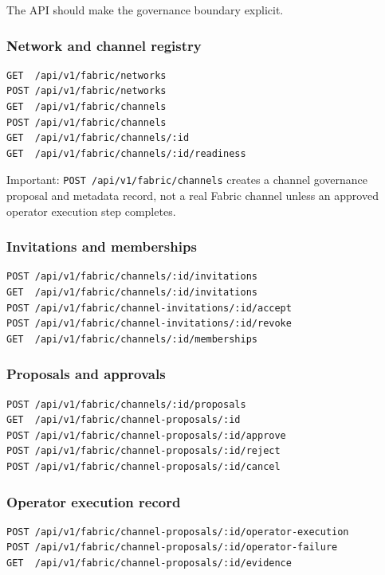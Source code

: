 The API should make the governance boundary explicit.

\subsubsection{Network and channel registry}

\begin{verbatim}
GET  /api/v1/fabric/networks
POST /api/v1/fabric/networks
GET  /api/v1/fabric/channels
POST /api/v1/fabric/channels
GET  /api/v1/fabric/channels/:id
GET  /api/v1/fabric/channels/:id/readiness
\end{verbatim}

Important: \texttt{POST /api/v1/fabric/channels} creates a channel governance proposal and metadata record, not a real Fabric channel unless an approved operator execution step completes.

\subsubsection{Invitations and memberships}

\begin{verbatim}
POST /api/v1/fabric/channels/:id/invitations
GET  /api/v1/fabric/channels/:id/invitations
POST /api/v1/fabric/channel-invitations/:id/accept
POST /api/v1/fabric/channel-invitations/:id/revoke
GET  /api/v1/fabric/channels/:id/memberships
\end{verbatim}

\subsubsection{Proposals and approvals}

\begin{verbatim}
POST /api/v1/fabric/channels/:id/proposals
GET  /api/v1/fabric/channel-proposals/:id
POST /api/v1/fabric/channel-proposals/:id/approve
POST /api/v1/fabric/channel-proposals/:id/reject
POST /api/v1/fabric/channel-proposals/:id/cancel
\end{verbatim}

\subsubsection{Operator execution record}

\begin{verbatim}
POST /api/v1/fabric/channel-proposals/:id/operator-execution
POST /api/v1/fabric/channel-proposals/:id/operator-failure
GET  /api/v1/fabric/channel-proposals/:id/evidence
\end{verbatim}

